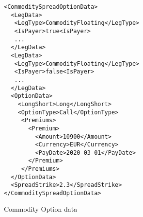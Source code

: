 \begin{listing}[H]
    \begin{verbatim}
<CommoditySpreadOptionData>
  <LegData>
   <LegType>CommodityFloating</LegType>
   <IsPayer>true<IsPayer>
   ...
  </LegData>
  <LegData>
   <LegType>CommodityFloating</LegType>
   <IsPayer>false<IsPayer>
   ...
  </LegData>
  <OptionData>
    <LongShort>Long</LongShort>
    <OptionType>Call</OptionType>
     <Premiums>
       <Premium>
         <Amount>10900</Amount>
         <Currency>EUR</Currency>
         <PayDate>2020-03-01</PayDate>
       </Premium>
     </Premiums>
  </OptionData>
  <SpreadStrike>2.3</SpreadStrike>
</CommoditySpreadOptionData>
    \end{verbatim}
    \caption{Commodity Option data}
    \label{lst:com_s_option_data}
\end{listing}
